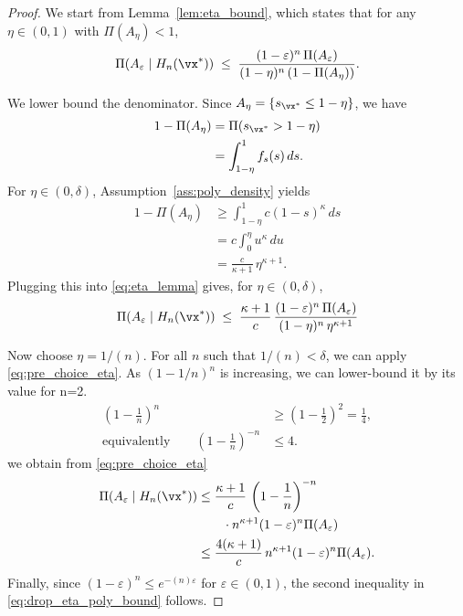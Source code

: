 \propBasinPosteriorSize*
\begin{proof}\label{proof:basin-posterior-size}
We start from Lemma~\ref{lem:eta_bound}, which states that for any $\eta\in(0,1)$ with
$\Pi(A_\eta)<1$,
\begin{equation}\label{eq:eta_lemma}
\Pi(A_\varepsilon\mid H_n(\vx^*))
\;\le\;
\frac{(1-\varepsilon)^{n}\,\Pi(A_\varepsilon)}{(1-\eta)^{n}\,(1-\Pi(A_\eta))}.
\end{equation}

We lower bound the denominator. Since $A_\eta=\{s_{\vx^*}\le 1-\eta\}$, we have
\[
\begin{aligned}
1-\Pi(A_\eta)
&=\Pi(s_{\vx^*}>1-\eta)\\
&=\int_{1-\eta}^{1} f_s(s)\,ds.
\end{aligned}
\]
For $\eta\in(0,\delta)$, Assumption~\ref{ass:poly_density} yields
\[
\begin{aligned}
1-\Pi(A_\eta)
&\ge \int_{1-\eta}^{1} c(1-s)^{\kappa}\,ds\\
&=c\int_{0}^{\eta} u^{\kappa}\,du\\
&=\frac{c}{\kappa+1}\,\eta^{\kappa+1}.
\end{aligned}
\]
Plugging this into \eqref{eq:eta_lemma} gives, for $\eta\in(0,\delta)$,
\begin{equation}\label{eq:pre_choice_eta}
\Pi(A_\varepsilon\mid H_n(\vx^*))
\;\le\;
\frac{\kappa+1}{c}\,
\frac{(1-\varepsilon)^{n}\,\Pi(A_\varepsilon)}{(1-\eta)^{n}\,\eta^{\kappa+1}}
\end{equation}

Now choose $\eta=1/(n)$. For all $n$ such that $1/(n)<\delta$, we can apply
\eqref{eq:pre_choice_eta}. As $(1-1/n)^n$ is increasing, we can lower-bound it by its value for n=2.
\[
\begin{aligned}
\left(1-\frac{1}{n}\right)^{n}
&\ge \left(1-\frac{1}{2}\right)^{2}
=\frac{1}{4},\\
\text{equivalently}\qquad
\left(1-\frac{1}{n}\right)^{-n}
&\le 4.
\end{aligned}
\]
we obtain from \eqref{eq:pre_choice_eta}
\[
\begin{aligned}
\Pi(A_\varepsilon\mid H_n(\vx^*))
&\le \frac{\kappa+1}{c}\,
\left(1-\frac{1}{n}\right)^{-n}\\
&\qquad{}\cdot n^{\kappa+1}(1-\varepsilon)^{n}\Pi(A_\varepsilon)\\
&\le \frac{4(\kappa+1)}{c}\,
n^{\kappa+1}(1-\varepsilon)^{n}\Pi(A_\varepsilon).
\end{aligned}
\]
Finally, since $(1-\varepsilon)^{n} \le e^{-(n)\varepsilon}$ for $\varepsilon\in(0,1)$,
the second inequality in \eqref{eq:drop_eta_poly_bound} follows.
\end{proof}


